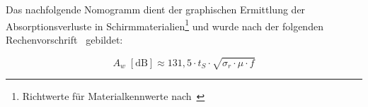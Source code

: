 

Das nachfolgende Nomogramm dient der graphischen Ermittlung der Absorptionsverluste in Schirmmaterialien\footnote{Richtwerte für Materialkennwerte nach~\cite{Simplified_shielding}} und wurde nach der folgenden Rechenvorschrift~\cite{Simplified_shielding} gebildet:

\begin{equation}
    A_w \; \left[\text{dB}\right] \approx 131,5 \cdot t_S \cdot \sqrt{\sigma_r \cdot \mu \cdot f}
\end{equation}